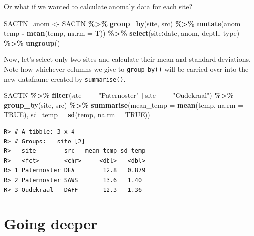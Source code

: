 \documentclass[
]{book}
\newenvironment{Shaded}{\begin{snugshade}}{\end{snugshade}}
\newcommand{\DataTypeTok}[1]{\textcolor[rgb]{0.13,0.29,0.53}{#1}}
\newcommand{\KeywordTok}[1]{\textcolor[rgb]{0.13,0.29,0.53}{\textbf{#1}}}
\newcommand{\NormalTok}[1]{#1}
\newcommand{\OperatorTok}[1]{\textcolor[rgb]{0.81,0.36,0.00}{\textbf{#1}}}
\newcommand{\OtherTok}[1]{\textcolor[rgb]{0.56,0.35,0.01}{#1}}
\newcommand{\StringTok}[1]{\textcolor[rgb]{0.31,0.60,0.02}{#1}}
\begin{document}
Or what if we wanted to calculate anomaly data for each site?

\begin{Shaded}
\begin{Highlighting}[]
\NormalTok{SACTN\_anom <{-}}\StringTok{ }\NormalTok{SACTN }\OperatorTok{\%>\%}
\StringTok{  }\KeywordTok{group\_by}\NormalTok{(site, src) }\OperatorTok{\%>\%}\StringTok{ }
\StringTok{  }\KeywordTok{mutate}\NormalTok{(}\DataTypeTok{anom =}\NormalTok{ temp }\OperatorTok{{-}}\StringTok{ }\KeywordTok{mean}\NormalTok{(temp, }\DataTypeTok{na.rm =}\NormalTok{ T)) }\OperatorTok{\%>\%}\StringTok{ }
\StringTok{  }\KeywordTok{select}\NormalTok{(site}\OperatorTok{:}\NormalTok{date, anom, depth, type) }\OperatorTok{\%>\%}\StringTok{ }
\StringTok{  }\KeywordTok{ungroup}\NormalTok{()}
\end{Highlighting}
\end{Shaded}

Now, let's select only two sites and calculate their mean and standard deviations. Note how whichever columns we give to \texttt{group\_by()} will be carried over into the new dataframe created by \texttt{summarise()}.

\begin{Shaded}
\begin{Highlighting}[]
\NormalTok{SACTN }\OperatorTok{\%>\%}\StringTok{ }
\StringTok{  }\KeywordTok{filter}\NormalTok{(site }\OperatorTok{==}\StringTok{ "Paternoster"} \OperatorTok{|}\StringTok{ }\NormalTok{site }\OperatorTok{==}\StringTok{ "Oudekraal"}\NormalTok{) }\OperatorTok{\%>\%}
\StringTok{  }\KeywordTok{group\_by}\NormalTok{(site, src) }\OperatorTok{\%>\%}\StringTok{ }
\StringTok{  }\KeywordTok{summarise}\NormalTok{(}\DataTypeTok{mean\_temp =} \KeywordTok{mean}\NormalTok{(temp, }\DataTypeTok{na.rm =} \OtherTok{TRUE}\NormalTok{), }
            \DataTypeTok{sd\_temp =} \KeywordTok{sd}\NormalTok{(temp, }\DataTypeTok{na.rm =} \OtherTok{TRUE}\NormalTok{))}
\end{Highlighting}
\end{Shaded}

\begin{verbatim}
R> # A tibble: 3 x 4
R> # Groups:   site [2]
R>   site        src   mean_temp sd_temp
R>   <fct>       <chr>     <dbl>   <dbl>
R> 1 Paternoster DEA        12.8   0.879
R> 2 Paternoster SAWS       13.6   1.40 
R> 3 Oudekraal   DAFF       12.3   1.36
\end{verbatim}

\hypertarget{going-deeper}{%
\section{Going deeper}\label{going-deeper}}
\end{document}
